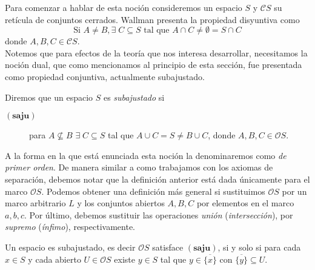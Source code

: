 \documentclass{comunicaciones}
\begin{document}
Para comenzar a hablar de esta noción consideremos un espacio $S$ y $\mathcal{C}S$ su retícula de conjuntos cerrados. Wallman presenta la propiedad disyuntiva como
\[
\mbox{Si }A\neq B, \exists\; C\subseteq S \mbox{ tal que }A\cap C\neq \emptyset=S\cap C
\]
donde $A, B, C\in \mathcal{C}S$.\\

Notemos que para efectos de la teoría que nos interesa desarrollar, necesitamos la noción dual, que como mencionamos al principio de esta sección, fue presentada como propiedad conjuntiva, actualmente subajustado. 

\begin{dfn}\label{saju}
Diremos que un espacio $S$ es \emph{subajustado} si

\begin{description}
    \item[$(\mathbf{saju})$] para $A\nsubseteq B$ $\exists\; C\subseteq S$ tal que $A\cup C=S\neq B\cup C$, donde $A, B, C\in \mathcal{O}S$.
\end{description}
\end{dfn}
A la forma en la que está enunciada esta noción la denominaremos como \emph{de primer orden}. De manera similar a como trabajamos con los axiomas de separación, debemos notar que la definición anterior está dada únicamente para el marco $\mathcal{O}S$. Podemos obtener una definición más general si sustituimos $\mathcal{O}S$ por un marco arbitrario $L$ y los conjuntos abiertos $A, B, C$ por elementos en el marco $a, b, c$. Por último, debemos sustituir las operaciones \emph{unión} (\emph{intersección}), por \emph{supremo} (\emph{ínfimo}), respectivamente.

\begin{thm}\label{Saju1}
    Un espacio es subajustado, es decir $\mathcal{O}S$ satisface $(\mathbf{saju})$, si y solo si para cada $x\in S$ y cada abierto $U\in \mathcal{O}S$ existe $y\in S$ tal que $y\in \overline{\{x\}}$ con $\overline{\{y\}}\subseteq U$.
\end{thm}
\end{document}

